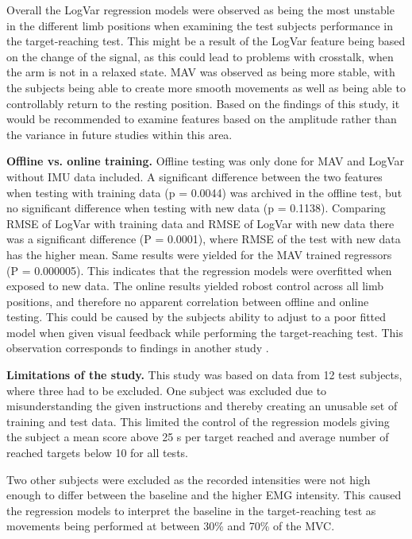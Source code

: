 \begin{multicols}{2}
Overall the LogVar regression models were observed as being the most unstable in the different limb positions when examining the test subjects performance in the target-reaching test. This might be a result of the LogVar feature being based on the change of the signal, as this could lead to problems with crosstalk, when the arm is not in a relaxed state. MAV was observed as being more stable, with the subjects being able to create more smooth movements as well as being able to controllably return to the resting position. Based on the findings of this study, it would be recommended to examine features based on the amplitude rather than the variance in future studies within this area.

\textbf{Offline vs. online training.}
Offline testing was only done for MAV and LogVar without IMU data included. A significant difference between the two features when testing with training data (p = 0.0044) was archived in the offline test, but no significant difference when testing with new data (p = 0.1138). Comparing RMSE of LogVar with training data and RMSE of LogVar with new data there was a significant difference (P = 0.0001), where RMSE of the test with new data has the higher mean. Same results were yielded for the MAV trained regressors (P = 0.000005). This indicates that the regression models were overfitted when exposed to new data. The online results yielded robost control across all limb positions, and therefore no apparent correlation between offline and online testing. This could be caused by the subjects ability to adjust to a poor fitted model when given visual feedback while performing the target-reaching test. This observation corresponds to findings in another study \cite{jiang2010}.

\textbf{Limitations of the study.}
This study was based on data from 12 test subjects, where three had to be excluded. One subject was excluded due to misunderstanding the given instructions and thereby creating an unusable set of training and test data. This limited the control of the regression models giving the subject a mean score above 25 s per target reached and average number of reached targets below 10 for all tests.

Two other subjects were excluded as the recorded intensities were not high enough to differ between the baseline and the higher EMG intensity. This caused the regression models to interpret the baseline in the target-reaching test as movements being performed at between 30\% and 70\% of the MVC. 


\end{multicols}
